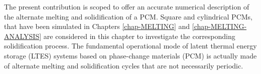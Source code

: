The present contribution is scoped  to offer an accurate numerical description of the alternate melting and solidification of a PCM.
Square and cylindrical PCMs, that have been simulated in Chapters \ref{chap-MELTING} and \ref{chap-MELTING-ANALYSIS} are considered in this chapter to investigate the corresponding solidification process.
The fundamental operational mode of latent thermal energy storage (LTES) systems based on phase-change materials (PCM) is actually made of alternate melting and solidification cycles that  are not necessarily periodic. 


